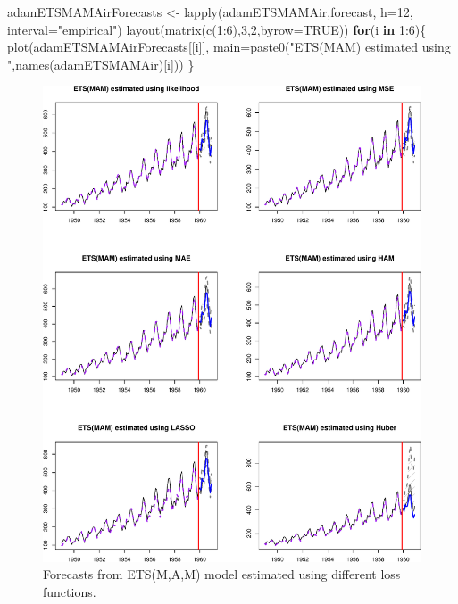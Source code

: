 \documentclass[
]{book}
\newenvironment{Shaded}{\begin{snugshade}}{\end{snugshade}}
\newcommand{\AttributeTok}[1]{\textcolor[rgb]{0.77,0.63,0.00}{#1}}
\newcommand{\ConstantTok}[1]{\textcolor[rgb]{0.00,0.00,0.00}{#1}}
\newcommand{\ControlFlowTok}[1]{\textcolor[rgb]{0.13,0.29,0.53}{\textbf{#1}}}
\newcommand{\DecValTok}[1]{\textcolor[rgb]{0.00,0.00,0.81}{#1}}
\newcommand{\FunctionTok}[1]{\textcolor[rgb]{0.00,0.00,0.00}{#1}}
\newcommand{\NormalTok}[1]{#1}
\newcommand{\OtherTok}[1]{\textcolor[rgb]{0.56,0.35,0.01}{#1}}
\newcommand{\SpecialCharTok}[1]{\textcolor[rgb]{0.00,0.00,0.00}{#1}}
\newcommand{\StringTok}[1]{\textcolor[rgb]{0.31,0.60,0.02}{#1}}
\theoremstyle{definition}
\theoremstyle{definition}
\theoremstyle{definition}
\theoremstyle{definition}
\theoremstyle{remark}
\begin{document}
\begin{Shaded}
\begin{Highlighting}[]
\NormalTok{adamETSMAMAirForecasts }\OtherTok{\textless{}{-}} \FunctionTok{lapply}\NormalTok{(adamETSMAMAir,forecast,}
                                 \AttributeTok{h=}\DecValTok{12}\NormalTok{, }\AttributeTok{interval=}\StringTok{"empirical"}\NormalTok{)}
\FunctionTok{layout}\NormalTok{(}\FunctionTok{matrix}\NormalTok{(}\FunctionTok{c}\NormalTok{(}\DecValTok{1}\SpecialCharTok{:}\DecValTok{6}\NormalTok{),}\DecValTok{3}\NormalTok{,}\DecValTok{2}\NormalTok{,}\AttributeTok{byrow=}\ConstantTok{TRUE}\NormalTok{))}
\ControlFlowTok{for}\NormalTok{(i }\ControlFlowTok{in} \DecValTok{1}\SpecialCharTok{:}\DecValTok{6}\NormalTok{)\{}
    \FunctionTok{plot}\NormalTok{(adamETSMAMAirForecasts[[i]],}
         \AttributeTok{main=}\FunctionTok{paste0}\NormalTok{(}\StringTok{"ETS(MAM) estimated using "}\NormalTok{,}\FunctionTok{names}\NormalTok{(adamETSMAMAir)[i]))}
\NormalTok{\}}
\end{Highlighting}
\end{Shaded}

\begin{figure}
\centering
\includegraphics{Svetunkov--2022----ADAM_files/figure-latex/adamModelsForecasts-1.pdf}
\caption{\label{fig:adamModelsForecasts}Forecasts from ETS(M,A,M) model estimated using different loss functions.}
\end{figure}
\end{document}
